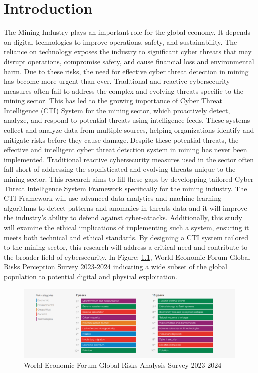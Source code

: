\documentclass[a4paper,twoside,12pt]{report}
\begin{document}
\chapter{Introduction}
The Mining Industry plays an important role for the global economy. It depends on digital technologies to improve operations, safety, and sustainability. The reliance on technology exposes the industry to significant cyber threats that may disrupt operations, compromise safety, and cause financial loss and environmental harm. Due to these risks, the need for effective cyber threat detection in mining has become more urgent than ever. Traditional and reactive cybersecurity measures often fail to address the complex and evolving threats specific to the mining sector. This has led to the growing importance of Cyber Threat Intelligence (CTI) System for the mining sector, which proactively detect, analyze, and respond to potential threats using intelligence feeds. These systems collect and analyze data from multiple sources, helping organizations identify and mitigate risks before they cause damage. Despite these potential threats, the effective and intelligent cyber threat detection system in mining has never been implemented. Traditional reactive cybersecurity measures used in the sector often fall short of addressing the sophisticated and evolving threats unique to the mining sector. This research aims to fill these gaps by developping tailored Cyber Threat Intelligence System Framework specifically for the mining industry. The CTI Framework will use advanced data analytics and machine learning algorithms to detect patterns and anomalies in threats data and it will improve the industry’s ability to defend against cyber-attacks. Additionally, this study will examine the ethical implications of implementing such a system, ensuring it meets both technical and ethical standards. By designing a CTI system tailored to the mining sector, this research will address a critical need and contribute to the broader field of cybersecurity. In Figure: \ref{fig:thing11}, World Economic Forum Global Risks Perception Survey 2023-2024 indicating a wide subset of the global population to potential digital and physical exploitation.

\begin{figure}[ht]
    \centering
    \includegraphics[width=1.0\linewidth]{images/world-economic-forum-global-risks.png}  %
    \caption{World Economic Forum Global Risks Analysis Survey 2023-2024}
    \label{fig:thing11}
\end{figure}
\end{document}
